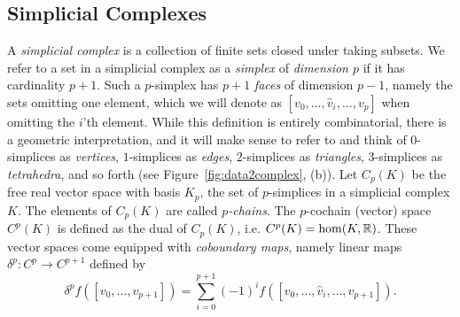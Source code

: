 \subsection{Simplicial Complexes}
A \emph{simplicial complex} is a collection of finite sets closed under taking subsets. We refer to a set in a simplicial complex as a \emph{simplex} of \emph{dimension $p$} if it has cardinality $p+1$. Such a $p$-simplex has $p+1$ \emph{faces} of dimension $p-1$, namely the sets omitting one element, which we will denote as $[v_0,\dotsc,\hat{v}_i,\dotsc, v_p]$ when omitting the $i$'th element. While this definition is entirely combinatorial, there is a geometric interpretation, and it will make sense to refer to and think of $0$-simplices as \emph{vertices}, $1$-simplices as \emph{edges}, $2$-simplices as \emph{triangles}, $3$-simplices as \emph{tetrahedra}, and so forth (see Figure~\ref{fig:data2complex}, (b)). Let $C_p(K)$ be the free real vector space with basis $K_p$, the set of $p$-simplices in 
a simplicial complex $K$. The elements of $C_p(K)$ are called \emph{$p$-chains}. The 
$p$-cochain (vector) space $C^p(K)$ is defined as the dual of $C_p(K)$, i.e. $C^p(K)=\hom(K,\mathbb{R})$. These vector spaces come equipped with \emph{coboundary maps}, namely linear maps $\delta^p:C^p\to C^{p+1}$ defined by
\begin{equation*}
\delta^p f([v_0,\dotsc,v_{p+1}]) = \sum_{i=0}^{p+1} (-1)^i f([v_0,\dotsc,\hat{v}_i,\dotsc,v_{p+1}]).
\end{equation*}
